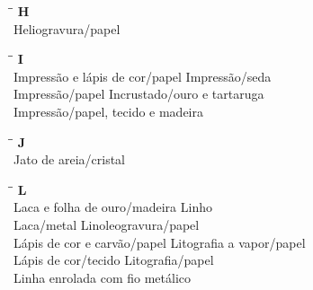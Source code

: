 \begin{tabbing}
	\hspace{8,7cm}\=\hspace{1cm}\=\kill
	\textbf{H} \>  \\ 
	Heliogravura/papel	\> \\   
\end{tabbing}

\begin{tabbing}
	\hspace{8,7cm}\=\hspace{1cm}\=\kill
	\textbf{I} \>  \\ 
	Impressão e lápis de cor/papel \> Impressão/seda\\ 
	Impressão/papel \> Incrustado/ouro e tartaruga \\	
	Impressão/papel, tecido e madeira \> \\    
\end{tabbing}

\begin{tabbing}
	\hspace{8,7cm}\=\hspace{1cm}\=\kill
	\textbf{J} \>  \\ 
	Jato de areia/cristal	\> \\   
\end{tabbing}

\begin{tabbing}
	\hspace{8,7cm}\=\hspace{1cm}\=\kill
	\textbf{L} \>  \\ 
	Laca e folha de ouro/madeira \> Linho\\ 
	Laca/metal \> Linoleogravura/papel \\
	Lápis de cor e carvão/papel \> Litografia a vapor/papel\\ 
	Lápis de cor/tecido \> Litografia/papel \\	
	Linha enrolada com fio metálico \> \\    
\end{tabbing}

